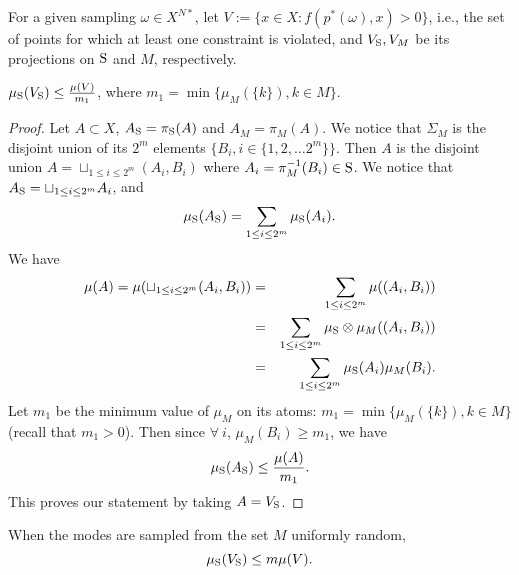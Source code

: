 
For a given sampling $\omega \in X^{N*}$, let $V:=\{x \in X: f(p^*(\omega),x) > 0\}$, i.e., the set of points for which at least one constraint is violated, and $V_{\text{S}}, V_M$ be its projections on $\text{S}$ and $M$, respectively. 

\begin{lemma}$\mu_{\text{S}}(V_{\text{S}}) \leq \frac{\mu(V)}{m_1}$, where $m_1 = \min \{\mu_M(\{k\}), k \in M\}$.\end{lemma}
\begin{proof}

Let $A \subset X$, $A_{\text{S}} = \pi_{\text{S}} (A)$ and $A_M = \pi_M (A)$. We notice that $\Sigma_M$ is the disjoint union of its $2^m$ elements $\{B_i, i \in \{1,2, \ldots 2^m\} \}$. Then $A$ is the disjoint union $A = \sqcup_{1 \leq i \leq 2^m} (A_i, B_i)$ where $A_i = \pi_M^{-1} (B_i) \in \text{S}$. We notice that 
$A_{\text{S}} = \sqcup_{1 \leq i \leq 2^m} A_i$, 
and
\begin{equation*}
\mu_{\text{S}} (A_{\text{S}}) = \sum_{1 \leq i \leq 2^m} \mu_{\text{S}} (A_i).
\end{equation*}
We have 
\begin{eqnarray*}
\mu(A) = \mu(\sqcup_{1 \leq i \leq 2^m} (A_i, B_i)) &=& \sum_{1 \leq i \leq 2^m} \mu( (A_i, B_i)) \\
 &=& \sum_{1 \leq i \leq 2^m} \mu_{\text{S}} \otimes \mu_M ((A_i, B_i)) \\
 & = &\sum_{1 \leq i \leq 2^m} \mu_{\text{S}}(A_i) \mu_M (B_i).
\end{eqnarray*}
Let $m_1$ be the minimum value  of $\mu_M$ on its atoms: $m_1 = \min \{\mu_M(\{k\}), k \in M\}$ (recall that $m_1 > 0$). Then since $ \forall \ i$, $\mu_M(B_i) \geq m_1$, we have
\begin{equation}
\mu_{\text{S}}(A_{\text{S}}) \leq \frac{\mu(A)}{m_1}.
\end{equation}
This proves our statement by taking $A = V_{\text{S}}$.
\end{proof}

\begin{corollary} \label{cor:measure}When the modes are sampled from the set $M$ uniformly random, 
\begin{equation*}\mu_{\text{S}}(V_{\text{S}}) \leq m \mu(V). \end{equation*}
\end{corollary}

